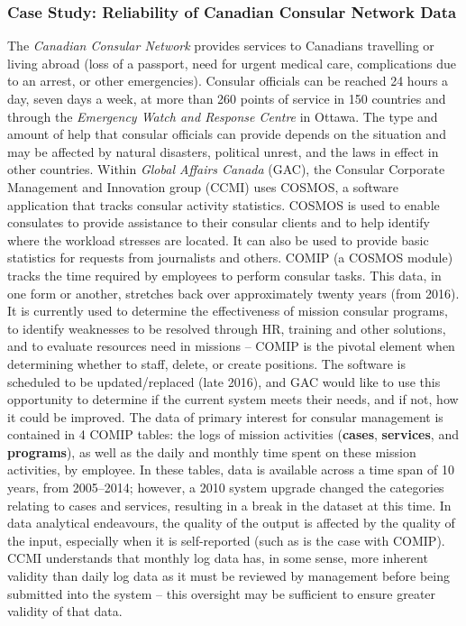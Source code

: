 \subsubsection{Case Study: Reliability of Canadian Consular Network Data}
The \textit{Canadian Consular Network} provides services to Canadians travelling or living abroad (loss of a passport, need for urgent medical care, complications due to an arrest, or other emergencies). Consular officials can be reached 24 hours a day, seven days a week, at more than 260 points of service in 150 countries and through the \textit{Emergency Watch and Response Centre} in Ottawa. The type and amount of help that consular officials can provide depends on the situation and may be affected by natural disasters, political unrest, and the laws in effect in other countries.
\newl Within \textit{Global Affairs Canada} (GAC), the Consular Corporate Management and Innovation group (CCMI) uses COSMOS, a software application that tracks consular activity statistics. COSMOS is used to enable consulates to provide assistance to their consular clients and to help identify where the workload stresses are located. It can also be used to provide basic statistics for requests from journalists and others.
\newl COMIP (a COSMOS module) tracks the time required by employees to perform consular tasks. This data, in one form or another, stretches back over approximately twenty years (from 2016). It is currently used to 
determine the effectiveness of mission consular programs, to identify weaknesses to be resolved through HR, training and other solutions, and to evaluate resources need in missions -- COMIP is the pivotal element when determining whether to staff, delete, or create positions. The software is scheduled to be updated/replaced (late 2016), and GAC would like to use this opportunity to determine if the current system meets their needs, and if not, how it could be improved. \newl 
The data of primary interest for consular management is contained in 4 COMIP tables: the logs of mission activities (\textbf{cases}, \textbf{services}, and \textbf{programs}), as well as the daily and monthly time spent on these mission activities, by employee. In these tables, data is available across a time span of 10 years, from 2005--2014; however, a 2010 system upgrade changed the categories relating to cases and services, resulting in a break in the dataset at this time. \newl 
In data analytical endeavours, the quality of the output is affected by the quality of the input, especially when it is self-reported (such as is the case with COMIP). CCMI understands that monthly log data has, in some sense, more inherent validity than daily log data as it must be reviewed by management before being submitted into the system -- this oversight may be sufficient to ensure greater validity of that data. 
